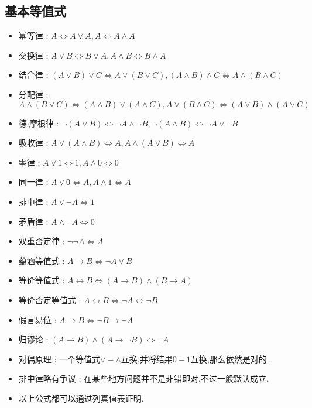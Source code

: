 {{  \subsection{基本等值式}{
    \begin{itemize}
      \item 幂等律 : $A \Leftrightarrow A \lor A,A \Leftrightarrow A \land A$
      \item 交换律 : $A \lor B \Leftrightarrow B \lor A,A \land B \Leftrightarrow B \land A$
      \item 结合律 : $(A \lor B) \lor C \Leftrightarrow A \lor (B \lor C),(A \land B) \land C \Leftrightarrow A \land (B \land C)$
      \item 分配律 : $A \land (B \lor C) \Leftrightarrow (A \land B) \lor (A \land C),A \lor (B \land C) \Leftrightarrow (A \lor B) \land (A \lor C)$
      \item 德$\cdot$摩根律 : $\lnot (A \lor B) \Leftrightarrow \lnot A \land \lnot B,\lnot (A \land B) \Leftrightarrow \lnot A \lor \lnot B$
      \item 吸收律 : $A \lor (A \land B) \Leftrightarrow A,A \land (A \lor B) \Leftrightarrow A$
      \item 零律 : $A \lor 1 \Leftrightarrow 1,A \land 0 \Leftrightarrow 0$
      \item 同一律 : $A \lor 0 \Leftrightarrow A,A \land 1 \Leftrightarrow A$
      \item 排中律 : $A \lor \lnot A \Leftrightarrow 1$
      \item 矛盾律 : $A \land \lnot A \Leftrightarrow 0$
      \item 双重否定律 : $\lnot \lnot A \Leftrightarrow A$
      \item 蕴涵等值式 : $A \to B \Leftrightarrow \lnot A \lor B$
      \item 等价等值式 : $A \leftrightarrow B \Leftrightarrow (A \to B) \land (B \to A)$
      \item 等价否定等值式 : $A \leftrightarrow B \Leftrightarrow \lnot A \leftrightarrow \lnot B$
      \item 假言易位 : $A \to B \Leftrightarrow \lnot B \to \lnot A$
      \item 归谬论 : $(A \to B) \land (A \to \lnot B) \Leftrightarrow \lnot A$
      \item 对偶原理 : 一个等值式$\lor - \land$互换,并将结果$0 - 1$互换,那么依然是对的.
      \item 排中律略有争议 : 在某些地方问题并不是非错即对,不过一般默认成立.
      \item 以上公式都可以通过列真值表证明.
    \end{itemize}
  }%

}}
